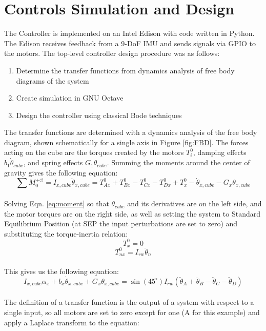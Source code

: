 \documentclass[]{aiaa-tc}%
\begin{document}
\section{Controls Simulation and Design}
The Controller is implemented on an Intel Edison with code written in Python. The Edison receives feedback from a 9-DoF IMU and sends signals via GPIO to the motors. The top-level controller design procedure was as follows:
\begin{enumerate}
\item Determine the transfer functions from dynamics analysis of free body diagrams of the system
\item Create simulation in GNU Octave
\item Design the controller using classical Bode techniques
\end{enumerate}
The transfer functions are determined with a dynamics analysis of the free body diagram, shown schematically for a single axis in Figure \ref{fig:FBD}. The forces acting on the cube are the torques created by the motors $T_i^0$, damping effects $b_1 \dot{\theta}_{cube}$, and spring effects $G_1 \theta_{cube}$. Summing the moments around the center of gravity gives the following equation:\\

\begin{equation}
\label{eq:moment}
\sum M_0^{+ \circlearrowleft} = I_{x,cube} \ddot{\theta}_{x,cube} = T^0_{Ax} + T^0_{Bx} - T^0_{Cx} - T^0_{Dx} + T^0_x - \dot{\theta}_{x,cube} - G_x \theta_{x,cube}
\end{equation}\\
	
Solving Eqn. \ref{eq:moment} so that $\theta_{cube}$ and its derivatives are on the left side, and the motor torques are on the right side, as well as setting the system to Standard Equilibrium Position (at SEP the input perturbations are set to zero) and substituting the torque-inertia relation:\\

\[
T^0_x = 0
\]
\[
T^0_{nx} = I_{rw}\ddot{\theta}_n\]\\

This gives us the following equation:\\
 
\[
I_{x,cube} \alpha_x + b_x \dot{\theta}_{x,cube} + G_x \theta_{x,cube} = \sin(45^{\circ}) I_{rw} (\ddot{\theta}_A + \ddot{\theta}_B -\ddot{\theta}_C - \ddot{\theta}_D)
\]\\	
The definition of a transfer function is the output of a system with respect to a single input, so all motors are set to zero except for one (A for this example) and apply a Laplace transform to the equation:\\
\end{document}

